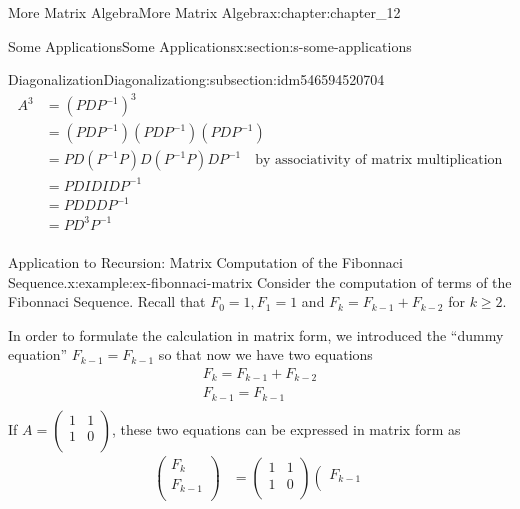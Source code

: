 \documentclass[oneside,10pt,]{book}
\numberwithin{equation}{section}
\begin{document}
\begin{chapterptx}{More Matrix Algebra}{}{More Matrix Algebra}{}{}{x:chapter:chapter_12}
\begin{sectionptx}{Some Applications}{}{Some Applications}{}{}{x:section:s-some-applications}
\begin{subsectionptx}{Diagonalization}{}{Diagonalization}{}{}{g:subsection:idm546594520704}
\begin{equation*}
\begin{split}
A^3   & = \left(P D P^{-1}\right)^3\\
& =\left(P D P^{-1}\right)\left(P D P^{-1}\right)\left(P D P^{-1}\right)\\
&= P D \left(P^{-1}P\right) D \left(P^{-1}P \right)D P^{-1}\quad\textrm{by associativity of matrix multiplication}\\
&= P D I D I D P^{-1}\\
&= P D D D P^{-1}\\	
&= P D^3 P^{-1}\\
\end{split}
\end{equation*}
%
\begin{example}{Application to Recursion: Matrix Computation of the Fibonnaci Sequence.}{x:example:ex-fibonnaci-matrix}%
%
Consider the computation of terms of the Fibonnaci Sequence.  Recall that  \(F_0= 1, F_1= 1\) and \(F_k= F_{k-1}+F_{k-2}\)  for \(k\geq 2\).%
\par
In order to formulate the calculation in matrix form, we introduced the ``dummy equation'' \(F_{k-1}= F_{k-1}\) so that now we have two equations%
\begin{equation*}
\begin{array}{c}
F_k= F_{k-1}+F_{k-2}\\
F_{k-1}= F_{k-1}\\
\end{array}
\end{equation*}
If \(A = \left(
\begin{array}{cc}
1 & 1 \\
1 & 0 \\
\end{array}
\right)\), these two equations can be expressed in matrix form as%
\begin{equation*}
\begin{split}
\left(
\begin{array}{c}
F_k \\
F_{k-1} \\
\end{array}
\right) &=\left(
\begin{array}{cc}
1 & 1 \\
1 & 0 \\
\end{array}
\right)\left(
\begin{array}{c}
F_{k-1} \\

\end{array}
\end{split}
\end{equation*}
\end{example}
\end{subsectionptx}
\end{sectionptx}
\end{chapterptx}
\end{document}
